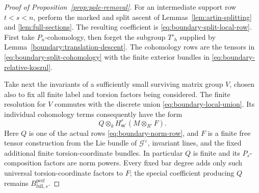 \begin{proof}[Proof of Proposition~\ref{prop:pole-removal}]
For an intermediate support row $t<s<n$, perform the marked and
split ascent of Lemmas~\ref{lem:artin-splitting} and
\ref{lem:full-sections}.  The resulting coefficient is
\eqref{eq:boundary-split-local-row}.  First take $P_n$-cohomology,
then forget the subgroup $T'_h$ supplied by
Lemma~\ref{boundary:translation-descent}.  The cohomology rows are
the tensors in \eqref{eq:boundary-split-cohomology} with the finite
exterior bundles in \eqref{eq:boundary-relative-koszul}.

Take next the invariants of a sufficiently small surviving matrix
group $V$, chosen also to fix all finite label and torsion factors
being considered.  The finite resolution for $V$ commutes with the
discrete union \eqref{eq:boundary-local-union}.  Its individual
cohomology terms consequently have the form
\begin{equation}
 \label{eq:boundary-before-Ps}
 Q\otimes_k H^r_{\mathfrak m'}(M\otimes_{R'}F).
\end{equation}
Here $Q$ is one of the actual rows
\eqref{eq:boundary-norm-row}, and $F$ is a finite free tensor
construction from the Lie bundle of $\mathcal G^\vee$,
invariant lines, and the fixed additional finite
torsion-coordinate bundles.  In particular $Q$ is finite and
its $P_s$-composition factors are norm powers.  Every fixed
bar degree adds only such universal torsion-coordinate factors
to $F$; the special coefficient producing $Q$ remains
$B_{\mathrm{full},s}^{\mathrm{perf}}$.


\end{proof}
